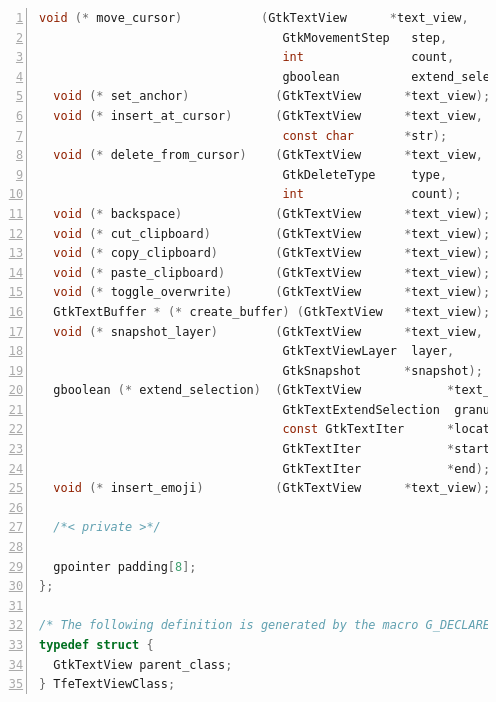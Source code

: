 \begin{lstlisting}[language=C, numbers=left]
  void (* move_cursor)           (GtkTextView      *text_view,
                                  GtkMovementStep   step,
                                  int               count,
                                  gboolean          extend_selection);
  void (* set_anchor)            (GtkTextView      *text_view);
  void (* insert_at_cursor)      (GtkTextView      *text_view,
                                  const char       *str);
  void (* delete_from_cursor)    (GtkTextView      *text_view,
                                  GtkDeleteType     type,
                                  int               count);
  void (* backspace)             (GtkTextView      *text_view);
  void (* cut_clipboard)         (GtkTextView      *text_view);
  void (* copy_clipboard)        (GtkTextView      *text_view);
  void (* paste_clipboard)       (GtkTextView      *text_view);
  void (* toggle_overwrite)      (GtkTextView      *text_view);
  GtkTextBuffer * (* create_buffer) (GtkTextView   *text_view);
  void (* snapshot_layer)        (GtkTextView      *text_view,
                                  GtkTextViewLayer  layer,
                                  GtkSnapshot      *snapshot);
  gboolean (* extend_selection)  (GtkTextView            *text_view,
                                  GtkTextExtendSelection  granularity,
                                  const GtkTextIter      *location,
                                  GtkTextIter            *start,
                                  GtkTextIter            *end);
  void (* insert_emoji)          (GtkTextView      *text_view);

  /*< private >*/

  gpointer padding[8];
};

/* The following definition is generated by the macro G_DECLARE_FINAL_TYPE */
typedef struct {
  GtkTextView parent_class;
} TfeTextViewClass;
\end{lstlisting}

